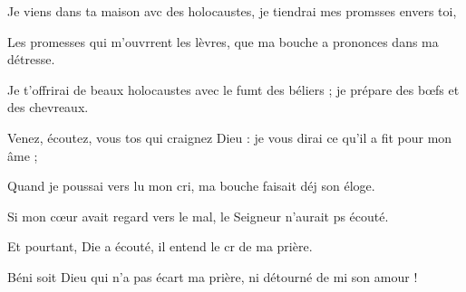 \item Je viens dans ta maison avc des holocaustes,\psstar{} je tiendrai mes promsses envers toi,
\item Les promesses qui m’ouvrrent les lèvres,\psstar{} que ma bouche a prononces dans ma détresse.
\item Je t’offrirai de beaux holocaustes\pscross{} avec le fumt des béliers ;\psstar{} je prépare des bœfs et des chevreaux.
\item Venez, écoutez, vous tos qui craignez Dieu :\psstar{} je vous dirai ce qu’il a fit pour mon âme ;
\item Quand je poussai vers lu mon cri,\psstar{} ma bouche faisait déj son éloge.
\item Si mon cœur avait regard vers le mal,\psstar{} le Seigneur n’aurait ps écouté.
\item Et pourtant, Die a écouté,\psstar{} il entend le cr de ma prière.
\item Béni soit Dieu qui n’a pas écart ma prière,\psstar{} ni détourné de mi son amour !